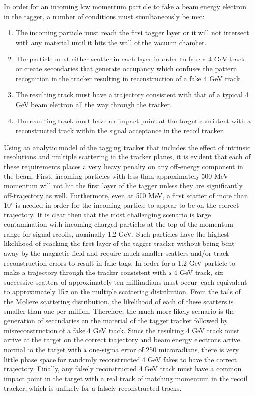 In order for an incoming low momentum particle to fake a beam energy electron in the tagger, a number of conditions must simultaneously be met:
\begin{enumerate}
    \item The incoming particle must reach the first tagger layer or it will not intersect with any material until it hits the wall of the vacuum chamber.
    \item The particle must either scatter in each layer in order to fake a 4 GeV track or create secondaries that generate occupancy which confuses the pattern recognition in the tracker resulting in reconstruction of a fake 4 GeV track.
    \item The resulting track must have a trajectory consistent with that of a typical 4 GeV beam electron all the way through the tracker.
    \item The resulting track must have an impact point at the target consistent with a reconstructed track within the signal acceptance in the recoil tracker. 
\end{enumerate}
Using an analytic model of the tagging tracker that includes the effect of intrinsic resolutions and multiple scattering in the tracker planes, it is evident that each of these requirements places a very heavy penalty on any off-energy component in the beam.  First, incoming particles with less than approximately 500 MeV momentum will not hit the first layer of the tagger unless they are significantly off-trajectory as well.  Furthermore, even at 500 MeV, a first scatter of more than 10$^\circ$ is needed in order for the incoming particle to appear to be on the correct trajectory. It is clear then that the most challenging scenario is large contamination with incoming charged particles at the top of the momentum range for signal recoils, nominally 1.2 GeV.  Such particles have the highest likelihood of reaching the first layer of the tagger tracker without being bent away by the magnetic field and require much smaller scatters and/or track reconstruction errors to result in fake tags. In order for a 1.2 GeV particle to make a trajectory through the tracker consistent with a 4 GeV track, six successive scatters of approximately ten milliradians must occur, each equivalent to approximately 15$\sigma$ on the multiple scattering distribution. From the tails of the Moliere scattering distribution, the likelihood of each of these scatters is smaller than one per million.  Therefore, the much more likely scenario is the generation of secondaries an the material of the tagger tracker followed by misreconstruction of a fake 4 GeV track.  Since the resulting 4 GeV track must arrive at the target on the correct trajectory and beam energy electrons arrive normal to the target with a one-sigma error of 250 microradians, there is very little phase space for randomly reconstructed 4 GeV fakes to have the correct trajectory.  Finally, any falsely reconstructed 4 GeV track must have a common impact point in the target with a real track of matching momentum in the recoil tracker, which is unlikely for a falsely reconstructed tracks.

